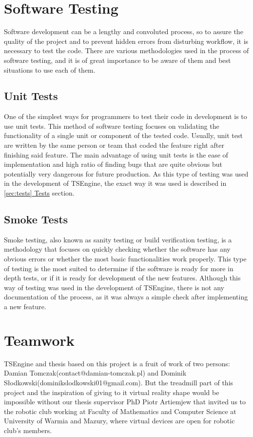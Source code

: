 \newpage
\section{Software Testing}
\label{sec:testing}
\hspace{\parindent}
Software development can be a lengthy and convoluted process, so to assure the quality of the project and to prevent hidden errors from disturbing workflow, it is necessary to test the code. There are various methodologies used in the process of software testing, and it is of great importance to be aware of them and best situations to use each of them.
\subsection{Unit Tests}
\hspace{\parindent}
One of the simplest ways for programmers to test their code in development is to use unit tests. This method of software testing focuses on validating the functionality of a single unit or component of the tested code. Usually, unit test are written by the same person or team that coded the feature right after finishing said feature. The main advantage of using unit tests is the ease of implementation and high ratio of finding bugs that are quite obvious but potentially very dangerous for future production. As this type of testing was used in the development of TSEngine, the exact way it was used is described in \hyperref[sec:tests]{\ref*{sec:tests} Tests} section.

\subsection{Smoke Tests}
\hspace{\parindent}
Smoke testing, also known as sanity testing or build verification testing, is a methodology that focuses on quickly checking whether the software has any obvious errors or whether the most basic functionalities work properly. This type of testing is the most suited to determine if the software is ready for more in depth tests, or if it is ready for development of the new features. Although this way of testing was used in the development of TSEngine, there is not any documentation of the process, as it was always a simple check after implementing a new feature.

\newpage
\section{Teamwork}
\label{sec:teamwork}
\hspace{\parindent} %
TSEngine and thesis based on this project is a fruit of work of two persons: Damian Tomczak(contact@damian-tomczak.pl) and Dominik Słodkowski(dominikslodkowski01@gmail.com).
But the treadmill part of this project and the inspiration of giving to it virtual reality shape would be impossible without our thesis supervisor PhD Piotr Artiemjew that invited us to the robotic club working at Faculty of Mathematics and Computer Science at University of Warmia and Mazury, where virtual devices are open for robotic club's members.

